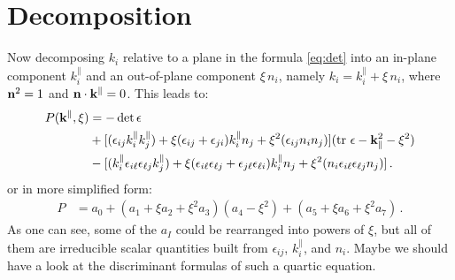 \documentclass[a4paper,12pt]{article}
\newcommand{\vct}[1]{{\bf #1}}
\begin{document}
\section{Decomposition}
Now decomposing $k_i$ relative to a plane in the formula \eqref{eq:det} into an in-plane component $k_i^\parallel$ and an 
out-of-plane component $\xi\,n_i$, namely $k_i = k_i^\parallel + \xi\,n_i$, where $\vct{n}^2 = 1$ and 
$\vct{n}\cdot\vct{k}^\parallel = 0$.
This leads to:
\begin{align}
 P(\vct{k}^\parallel, \xi) &= -\det\epsilon\nonumber\\& 
  + [(\epsilon_{ij} k^\parallel_i k^\parallel_j) 
    + \xi (\epsilon_{ij} + \epsilon_{ji}) k_i^\parallel n_j 
    + \xi^2 (\epsilon_{ij} n_i n_j)](\text{tr }\epsilon - \vct{k}^2_\parallel - \xi^2)\nonumber\\&
  - [(k^\parallel_i \epsilon_{i\ell} \epsilon_{\ell j} k^\parallel_j)
     + \xi (\epsilon_{i\ell} \epsilon_{\ell j} + \epsilon_{j\ell} \epsilon_{\ell i}) k_i^\parallel n_j
     + \xi^2 (n_i \epsilon_{i\ell} \epsilon_{\ell j} n_j)]\,.
\end{align}
or in more simplified form:
\begin{align}
 P &= a_0 + (a_1 + \xi a_2 + \xi^2 a_3) (a_4 - \xi^2) + (a_5 + \xi a_6 + \xi^2 a_7)\,.
\end{align}
As one can see, some of the $a_I$ could be rearranged into powers of $\xi$, but all of them are irreducible scalar quantities
built from $\epsilon_{ij}$, $k_i^\parallel$, and $n_i$. Maybe we should have a look at the discriminant formulas of such a
quartic equation.
\end{document}

